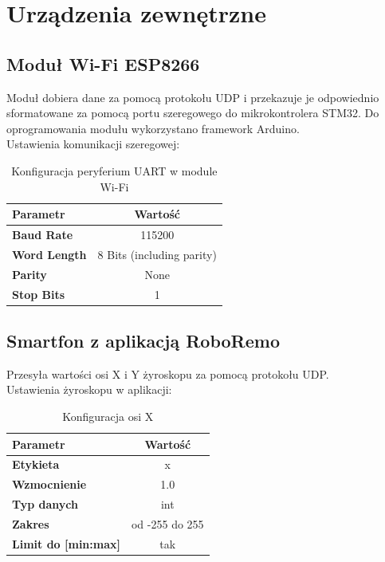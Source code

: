 \documentclass[10pt, a4paper]{article}
\begin{document}
\section{Urządzenia zewnętrzne}
	\subsection{Moduł Wi-Fi ESP8266}
	Moduł dobiera dane za pomocą protokołu UDP i przekazuje je odpowiednio sformatowane za pomocą portu szeregowego do mikrokontrolera STM32. Do oprogramowania modułu wykorzystano framework Arduino. \\
	Ustawienia komunikacji szeregowej:
		\begin{table}[H]
			\centering
			\begin{tabular}{|l|c|} \hline
				\textbf{Parametr} & Wartość \\
				\hline
				\hline  \textbf{Baud Rate}&115200  \\\hline
				\textbf{Word Length } & 8 Bits (including parity)\\\hline
				\textbf{Parity} &  None\\
				\hline
				\textbf{Stop Bits}& 1\\
				\hline
			\end{tabular}
			\caption{Konfiguracja peryferium UART w module Wi-Fi}
			\label{tab:UARTWiFI}
		\end{table}
	
	\subsection{Smartfon z aplikacją RoboRemo}
	Przesyła wartości osi X i Y żyroskopu za pomocą protokołu UDP. \\ 
	Ustawienia żyroskopu w aplikacji:
	\begin{table}[H]
		\centering
		\begin{tabular}{|l|c|} 
			\hline
			\textbf{Parametr} & Wartość \\
			\hline
			\hline  \textbf{Etykieta}&x  \\\hline
			 \textbf{Wzmocnienie}&1.0  \\\hline
			\textbf{Typ danych} & int\\\hline
			\textbf{Zakres} &  od -255 do 255\\
			\hline
			\textbf{Limit do [min:max]}& tak\\
			\hline
		\end{tabular}
		\caption{Konfiguracja osi X}
		\label{tab:OsX}
	\end{table}
\end{document}
